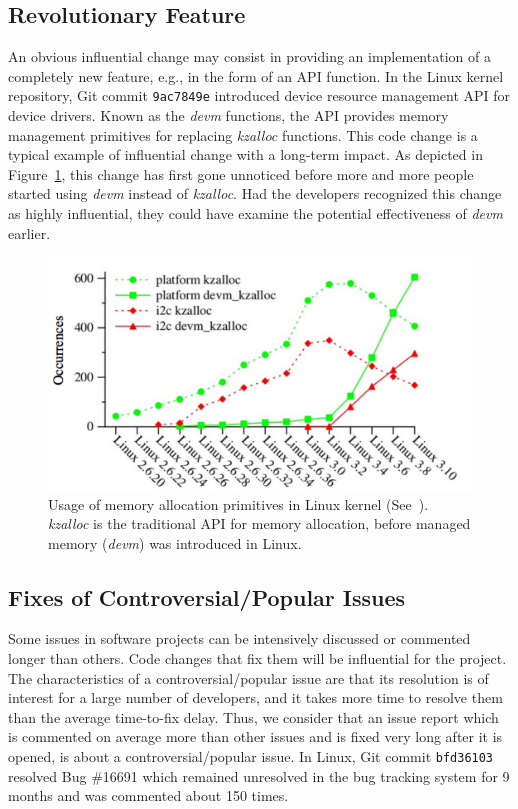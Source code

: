 \subsection{Revolutionary Feature}

An obvious influential change may consist in providing an implementation of
a completely new feature, e.g., in the form of an API function.
In the Linux kernel repository, Git commit {\tt 9ac7849e} introduced device resource management
API for device drivers. Known as the {\it devm} functions, the API
provides memory management primitives for replacing {\it kzalloc} functions.
This code change is a typical example of influential change with a long-term impact.
As depicted in Figure~\ref{fig:devm}, this change has first gone unnoticed
before more and more people started using {\it devm} instead of {\it kzalloc}.
Had the developers recognized this change as highly influential, they could have examine the potential effectiveness of {\it devm} earlier.



\begin{figure}[!h]%
    \centering
    \includegraphics[width=0.6\linewidth]{fig/devm}
    \caption{Usage of memory allocation primitives in Linux kernel (See~\cite{recipes_devm}). {\it kzalloc} is the traditional API for memory allocation,
before managed memory ({\it devm}) was introduced in Linux.}
    \label{fig:devm}
\end{figure}


\subsection{Fixes of Controversial/Popular Issues}
Some issues in software projects can be intensively discussed or commented longer than others.
Code changes that fix them will be influential for the project. The characteristics of a controversial/popular issue
are that its resolution is of interest for a large number of developers, and it takes more time
to resolve them than the average time-to-fix delay. Thus, we consider that an issue report
which is commented on average more than other issues and is fixed very long after it
is opened, is about a controversial/popular issue. In Linux, Git commit {\tt bfd36103}
resolved Bug \#16691 which remained unresolved in the bug tracking system for 9 months
and was commented about 150 times.
